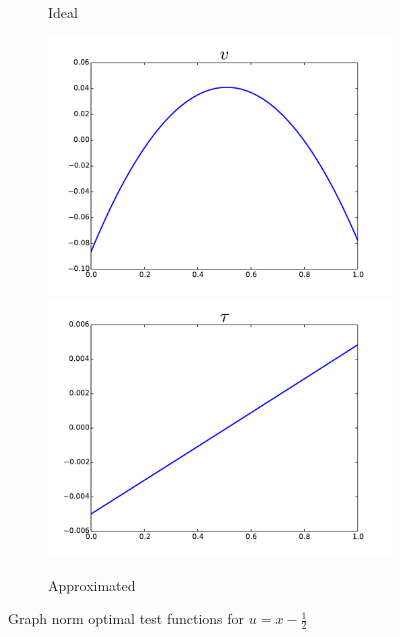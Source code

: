 \documentclass{article}
\begin{document}
\begin{figure}[ht]
\begin{subfigure}[t]{0.4\textwidth}
\caption{Ideal}
\label{fig:idealGraph}
\end{subfigure}
\begin{subfigure}[t]{0.4\textwidth}
\centering
\includegraphics[width=\textwidth]{OptimalTestFunctions/uLinear_1e-2/steady/graph_steady_v_approx3}\\
\includegraphics[width=\textwidth]{OptimalTestFunctions/uLinear_1e-2/steady/graph_steady_tau_approx3}\\
\caption{Approximated}
\label{fig:approxGraph}
\end{subfigure}
\caption{Graph norm optimal test functions for $u=x-\frac{1}{2}$}
\label{fig:optimalGraph}
\end{figure}
\end{document}
